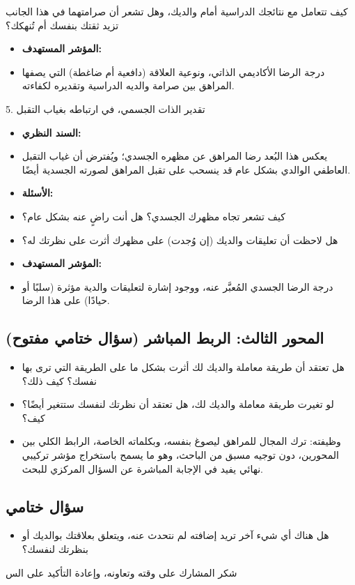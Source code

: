 \documentclass[12pt,oneside]{report}
\begin{document}
كيف تتعامل مع نتائجك الدراسية أمام والديك، وهل تشعر أن صرامتهما في هذا الجانب تزيد ثقتك بنفسك أم تُنهكك؟

\begin{itemize}[leftmargin=1.6em,itemsep=1pt]
\item \textbf{المؤشر المستهدف:}
\item درجة الرضا الأكاديمي الذاتي، ونوعية العلاقة (دافعية أم ضاغطة) التي يصفها المراهق بين صرامة والديه الدراسية وتقديره لكفاءته.
\end{itemize}
5. تقدير الذات الجسمي، في ارتباطه بغياب التقبل

\begin{itemize}[leftmargin=1.6em,itemsep=1pt]
\item \textbf{السند النظري:}
\item يعكس هذا البُعد رضا المراهق عن مظهره الجسدي؛ ويُفترض أن غياب التقبل العاطفي الوالدي بشكل عام قد ينسحب على تقبل المراهق لصورته الجسدية أيضًا.
\item \textbf{الأسئلة:}
\item كيف تشعر تجاه مظهرك الجسدي؟ هل أنت راضٍ عنه بشكل عام؟
\item هل لاحظت أن تعليقات والديك (إن وُجدت) على مظهرك أثرت على نظرتك له؟
\item \textbf{المؤشر المستهدف:}
\item درجة الرضا الجسدي المُعبَّر عنه، ووجود إشارة لتعليقات والدية مؤثرة (سلبًا أو حيادًا) على هذا الرضا.
\end{itemize}
\subsection*{المحور الثالث: الربط المباشر (سؤال ختامي مفتوح)}
\begin{itemize}[leftmargin=1.6em,itemsep=1pt]
\item هل تعتقد أن طريقة معاملة والديك لك أثرت بشكل ما على الطريقة التي ترى بها نفسك؟ كيف ذلك؟
\item لو تغيرت طريقة معاملة والديك لك، هل تعتقد أن نظرتك لنفسك ستتغير أيضًا؟ كيف؟
\item وظيفته: ترك المجال للمراهق ليصوغ بنفسه، وبكلماته الخاصة، الرابط الكلي بين المحورين، دون توجيه مسبق من الباحث، وهو ما يسمح باستخراج مؤشر تركيبي نهائي يفيد في الإجابة المباشرة عن السؤال المركزي للبحث.
\end{itemize}
\subsection*{سؤال ختامي}
\begin{itemize}[leftmargin=1.6em,itemsep=1pt]
\item هل هناك أي شيء آخر تريد إضافته لم نتحدث عنه، ويتعلق بعلاقتك  بوالديك أو بنظرتك لنفسك؟
\end{itemize}
شكر المشارك على وقته وتعاونه، وإعادة التأكيد على الس
\end{document}
